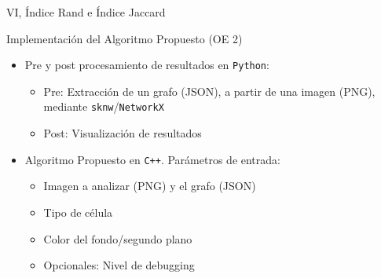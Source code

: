 \begin{frame}{VI, \'Indice Rand e \'Indice Jaccard}
\end{frame}



\begin{frame}{Implementaci\'on del Algoritmo Propuesto (OE 2)}
    \begin{itemize}
        \item Pre y post procesamiento de resultados en {\tt Python}: 
        \begin{itemize}
            \item Pre: Extracci\'on de un grafo (JSON), a partir de una imagen (PNG),  mediante {\tt sknw}/{\tt NetworkX}
            \item Post: Visualizaci\'on de resultados
        \end{itemize}
        
        \item Algoritmo Propuesto en {\tt C++}. Par\'ametros de entrada:
        \begin{itemize}
            \item Imagen a analizar (PNG) y el grafo (JSON)
            \item Tipo de c\'elula
            \item Color del fondo/segundo plano
            \item Opcionales: Nivel de debugging
        \end{itemize}
        
        
    \end{itemize}
\end{frame}

